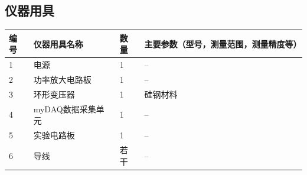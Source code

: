 \documentclass[dvipsnames, svgnames,a4paper,11pt]{article}
\begin{document}
	\subsection{仪器用具}
	\begin{table}[htbp]
		\centering
		\renewcommand\arraystretch{1.6}
		\begin{tabular}{p{}|p{}|p{}|p{}}
			\hline
			编号& 仪器用具名称 & 数量 &  主要参数（型号，测量范围，测量精度等） \\
			\hline
			1& 电源 & 1 & -- \\
			
			2& 功率放大电路板 & 1 & -- \\
			
			3& 环形变压器 & 1 & 硅钢材料 \\
			
			4& myDAQ数据采集单元 & 1 & -- \\
			
			5& 实验电路板 & 1 & -- \\
			
			6& 导线 & 若干 & -- \\
			\hline
		\end{tabular}
	\end{table}
	
	
	
\end{document}
